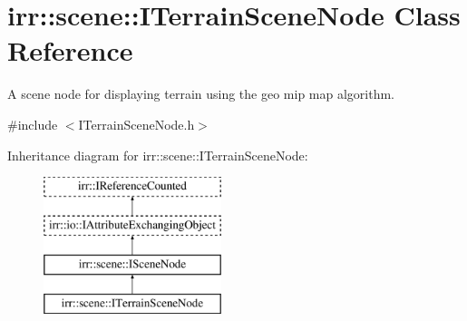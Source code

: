 \hypertarget{classirr_1_1scene_1_1ITerrainSceneNode}{}\section{irr\+:\+:scene\+:\+:I\+Terrain\+Scene\+Node Class Reference}
\label{classirr_1_1scene_1_1ITerrainSceneNode}


A scene node for displaying terrain using the geo mip map algorithm.  




{\ttfamily \#include $<$I\+Terrain\+Scene\+Node.\+h$>$}

Inheritance diagram for irr\+:\+:scene\+:\+:I\+Terrain\+Scene\+Node\+:\begin{figure}[H]
\begin{center}
\leavevmode
\includegraphics[height=4.000000cm]{classirr_1_1scene_1_1ITerrainSceneNode}
\end{center}
\end{figure}
